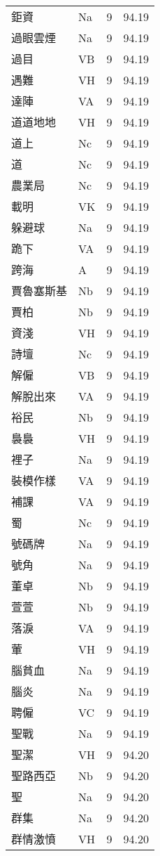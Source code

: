 \documentclass[twocolumn]{book}
\begin{document}
\begin{supertabular}{llrr}
鉅資 & Na & 9 &  94.19\\
過眼雲煙 & Na & 9 &  94.19\\
過目 & VB & 9 &  94.19\\
遇難 & VH & 9 &  94.19\\
達陣 & VA & 9 &  94.19\\
道道地地 & VH & 9 &  94.19\\
道上 & Nc & 9 &  94.19\\
道 & Nc & 9 &  94.19\\
農業局 & Nc & 9 &  94.19\\
載明 & VK & 9 &  94.19\\
躲避球 & Na & 9 &  94.19\\
跪下 & VA & 9 &  94.19\\
跨海 & A & 9 &  94.19\\
賈魯塞斯基 & Nb & 9 &  94.19\\
賈柏 & Nb & 9 &  94.19\\
資淺 & VH & 9 &  94.19\\
詩壇 & Nc & 9 &  94.19\\
解僱 & VB & 9 &  94.19\\
解脫出來 & VA & 9 &  94.19\\
裕民 & Nb & 9 &  94.19\\
裊裊 & VH & 9 &  94.19\\
裡子 & Na & 9 &  94.19\\
裝模作樣 & VA & 9 &  94.19\\
補課 & VA & 9 &  94.19\\
蜀 & Nc & 9 &  94.19\\
號碼牌 & Na & 9 &  94.19\\
號角 & Na & 9 &  94.19\\
董卓 & Nb & 9 &  94.19\\
萱萱 & Nb & 9 &  94.19\\
落淚 & VA & 9 &  94.19\\
葷 & VH & 9 &  94.19\\
腦貧血 & Na & 9 &  94.19\\
腦炎 & Na & 9 &  94.19\\
聘僱 & VC & 9 &  94.19\\
聖戰 & Na & 9 &  94.19\\
聖潔 & VH & 9 &  94.20\\
聖路西亞 & Nb & 9 &  94.20\\
聖 & Na & 9 &  94.20\\
群集 & Na & 9 &  94.20\\
群情激憤 & VH & 9 &  94.20\\

\end{supertabular}
\end{document}
